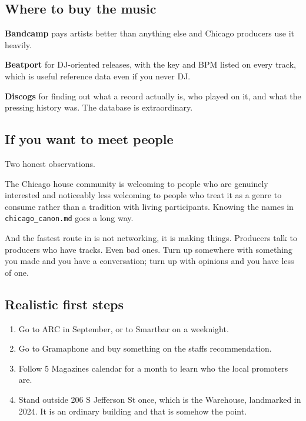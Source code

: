 \subsection{Where to buy the music}\label{li02_scene-where-to-buy-the-music}

\textbf{Bandcamp} pays artists better than anything else and Chicago producers use it heavily.

\textbf{Beatport} for DJ-oriented releases, with the key and BPM listed on every track, which is
useful reference data even if you never DJ.

\textbf{Discogs} for finding out what a record actually is, who played on it, and what the pressing
history was. The database is extraordinary.

\subsection{If you want to meet people}\label{li02_scene-if-you-want-to-meet-people}

Two honest observations.

The Chicago house community is welcoming to people who are genuinely interested and
noticeably less welcoming to people who treat it as a genre to consume rather than a
tradition with living participants. Knowing the names in \texttt{chicago\_canon.md} goes a long way.

And the fastest route in is not networking, it is making things. Producers talk to producers
who have tracks. Even bad ones. Turn up somewhere with something you made and you have a
conversation; turn up with opinions and you have less of one.

\subsection{Realistic first steps}\label{li02_scene-realistic-first-steps}

\begin{enumerate}
\def\labelenumi{\arabic{enumi}.}
\tightlist
\item
  Go to ARC in September, or to Smartbar on a weeknight.
\item
  Go to Gramaphone and buy something on the staff\textquotesingle s recommendation.
\item
  Follow 5 Magazine\textquotesingle s calendar for a month to learn who the local promoters are.
\item
  Stand outside 206 S Jefferson St once, which is the Warehouse, landmarked in 2024. It is
  an ordinary building and that is somehow the point.
\end{enumerate}
